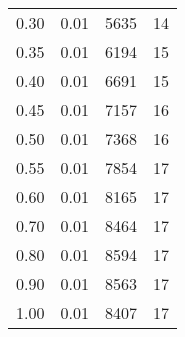 \begin{tabular}{SSSS}
0.30                                               & 0.01                                       & 5635                              & 14                              \\
0.35                                               & 0.01                                       & 6194                              & 15                              \\
0.40                                               & 0.01                                       & 6691                              & 15                              \\
0.45                                               & 0.01                                       & 7157                              & 16                              \\
0.50                                               & 0.01                                       & 7368                              & 16                              \\
0.55                                               & 0.01                                       & 7854                              & 17                              \\
0.60                                               & 0.01                                       & 8165                              & 17                              \\
0.70                                               & 0.01                                       & 8464                              & 17                              \\
0.80                                               & 0.01                                       & 8594                              & 17                              \\
0.90                                               & 0.01                                       & 8563                              & 17                              \\
1.00                                               & 0.01                                       & 8407                              & 17                              \\ \bottomrule
\end{tabular}